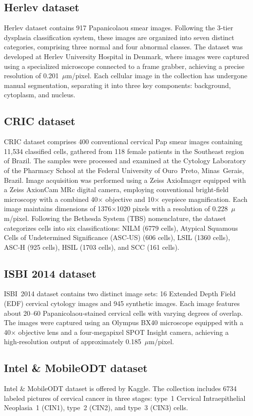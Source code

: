 \documentclass[final,5p,times,twocolumn,authoryear]{elsarticle}
\begin{document}
\subsection{Herlev dataset}
Herlev dataset \cite{ref6} contains 917 Papanicolaou smear images. Following the 3‑tier dysplasia classification system, these images are organized into seven distinct categories, comprising three normal and four abnormal classes. The dataset was developed at Herlev University Hospital in Denmark, where images were captured using a specialized microscope connected to a frame grabber, achieving a precise resolution of 0.201~\(\mu\)m/pixel. Each cellular image in the collection has undergone manual segmentation, separating it into three key components: background, cytoplasm, and nucleus.
\subsection{CRIC dataset}
CRIC dataset \cite{ref19} comprises 400 conventional cervical Pap smear images containing 11,534 classified cells, gathered from 118 female patients in the Southeast region of Brazil. The samples were processed and examined at the Cytology Laboratory of the Pharmacy School at the Federal University of Ouro Preto, Minas Gerais, Brazil. Image acquisition was performed using a Zeiss AxioImager equipped with a Zeiss AxionCam MRc digital camera, employing conventional bright‑field microscopy with a combined 40\(\times\) objective and 10\(\times\) eyepiece magnification. Each image maintains dimensions of 1376\(\times\)1020 pixels with a resolution of 0.228~\(\mu\)m/pixel. Following the Bethesda System (TBS) nomenclature, the dataset categorizes cells into six classifications: NILM (6779 cells), Atypical Squamous Cells of Undetermined Significance (ASC‑US) (606 cells), LSIL (1360 cells), ASC‑H (925 cells), HSIL (1703 cells), and SCC (161 cells).
\subsection{ISBI 2014 dataset}
ISBI 2014 dataset \cite{ref20} contains two distinct image sets: 16 Extended Depth Field (EDF) cervical cytology images and 945 synthetic images. Each image features about 20–60 Papanicolaou‑stained cervical cells with varying degrees of overlap. The images were captured using an Olympus BX40 microscope equipped with a 40\(\times\) objective lens and a four‑megapixel SPOT Insight camera, achieving a high‑resolution output of approximately 0.185~\(\mu\)m/pixel.
\subsection{Intel \& MobileODT dataset}
Intel \& MobileODT dataset \cite{ref21} is offered by Kaggle. The collection includes 6734 labeled pictures of cervical cancer in three stages: type 1 Cervical Intraepithelial Neoplasia 1 (CIN1), type 2 (CIN2), and type 3 (CIN3) cells.
\end{document}
